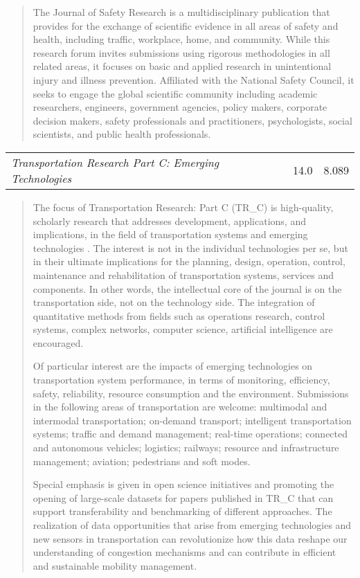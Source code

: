 	\begin{quote}	
The Journal of Safety Research is a multidisciplinary publication that provides for the exchange of scientific evidence in all areas of safety and health, including traffic, workplace, home, and community. While this research forum invites submissions using rigorous methodologies in all related areas, it focuses on basic and applied research in unintentional injury and illness prevention. Affiliated with the National Safety Council, it seeks to engage the global scientific community including academic researchers, engineers, government agencies, policy makers, corporate decision makers, safety professionals and practitioners, psychologists, social scientists, and public health professionals.
	\end{quote}

\noindent\begin{tabular}{@{}p{4in}p{1in}p{1in}}
	\it Transportation Research Part C:  Emerging Technologies & 14.0 & 8.089 \cr
\end{tabular}

	\begin{quote}	
The focus of Transportation Research: Part C (TR\_C) is high-quality, scholarly research that addresses development, applications, and implications, in the field of transportation systems and emerging technologies . The interest is not in the individual technologies per se, but in their ultimate implications for the planning, design, operation, control, maintenance and rehabilitation of transportation systems, services and components. In other words, the intellectual core of the journal is on the transportation side, not on the technology side. The integration of quantitative methods from fields such as operations research, control systems, complex networks, computer science, artificial intelligence are encouraged.

Of particular interest are the impacts of emerging technologies on transportation system performance, in terms of monitoring, efficiency, safety, reliability, resource consumption and the environment. Submissions in the following areas of transportation are welcome: multimodal and intermodal transportation; on-demand transport; intelligent transportation systems; traffic and demand management; real-time operations; connected and autonomous vehicles; logistics; railways; resource and infrastructure management; aviation; pedestrians and soft modes.

Special emphasis is given in open science initiatives and promoting the opening of large-scale datasets for papers published in TR\_C that can support transferability and benchmarking of different approaches. The realization of data opportunities that arise from emerging technologies and new sensors in transportation can revolutionize how this data reshape our understanding of congestion mechanisms and can contribute in efficient and sustainable mobility management.	
	\end{quote}


